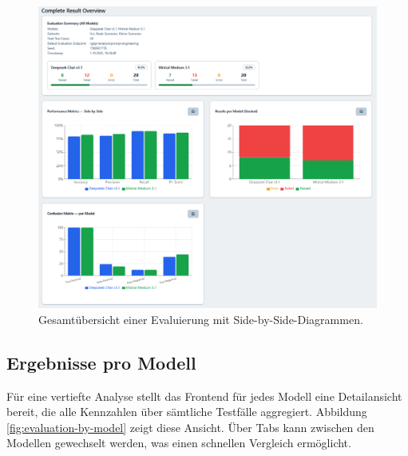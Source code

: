 \begin{figure}
    \centering
    \includegraphics[height=.55\textheight]{images/evaluation/evaluation-result-overview}
    \caption{Gesamtübersicht einer Evaluierung mit Side-by-Side-Diagrammen.}
    \label{fig:evaluation-overview}
\end{figure}

\subsection*{Ergebnisse pro Modell}

Für eine vertiefte Analyse stellt das Frontend für jedes Modell eine Detailansicht bereit, die alle Kennzahlen über sämtliche Testfälle aggregiert. Abbildung \ref{fig:evaluation-by-model} zeigt diese Ansicht. Über Tabs kann zwischen den Modellen gewechselt werden, was einen schnellen Vergleich ermöglicht.

